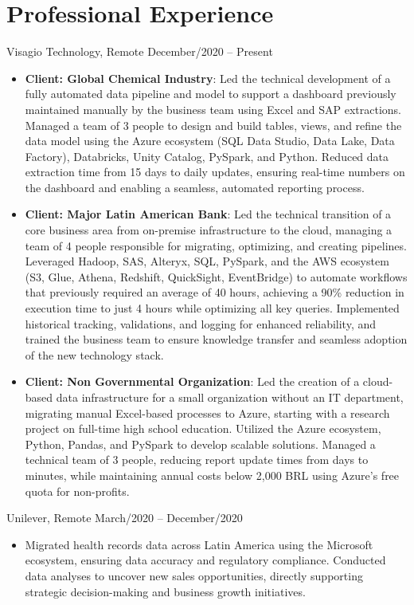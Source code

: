 \documentclass[a4paper,10pt]{article}
\begin{document}
\section*{Professional Experience}

\noindent
{} Visagio Technology, Remote \hfill December/2020 -- Present
\begin{itemize}[leftmargin=*]
    \item \textbf{Client: Global Chemical Industry}: Led the technical development of a fully automated data pipeline and model to support a dashboard previously maintained manually by the business team using Excel and SAP extractions. Managed a team of 3 people to design and build tables, views, and refine the data model using the Azure ecosystem (SQL Data Studio, Data Lake, Data Factory), Databricks, Unity Catalog, PySpark, and Python. Reduced data extraction time from 15 days to daily updates, ensuring real-time numbers on the dashboard and enabling a seamless, automated reporting process.
    \item \textbf{Client: Major Latin American Bank}: Led the technical transition of a core business area from on-premise infrastructure to the cloud, managing a team of 4 people responsible for migrating, optimizing, and creating pipelines. Leveraged Hadoop, SAS, Alteryx, SQL, PySpark, and the AWS ecosystem (S3, Glue, Athena, Redshift, QuickSight, EventBridge) to automate workflows that previously required an average of 40 hours, achieving a 90\% reduction in execution time to just 4 hours while optimizing all key queries. Implemented historical tracking, validations, and logging for enhanced reliability, and trained the business team to ensure knowledge transfer and seamless adoption of the new technology stack.
    \item \textbf{Client: Non Governmental Organization}: Led the creation of a cloud-based data infrastructure for a small organization without an IT department, migrating manual Excel-based processes to Azure, starting with a research project on full-time high school education. Utilized the Azure ecosystem, Python, Pandas, and PySpark to develop scalable solutions. Managed a technical team of 3 people, reducing report update times from days to minutes, while maintaining annual costs below 2,000 BRL using Azure's free quota for non-profits.
\end{itemize}

\noindent
{} Unilever, Remote \hfill March/2020 -- December/2020
\begin{itemize}[leftmargin=*]
    \item Migrated health records data across Latin America using the Microsoft ecosystem, ensuring data accuracy and regulatory compliance. Conducted data analyses to uncover new sales opportunities, directly supporting strategic decision-making and business growth initiatives.
\end{itemize}
\end{document}
